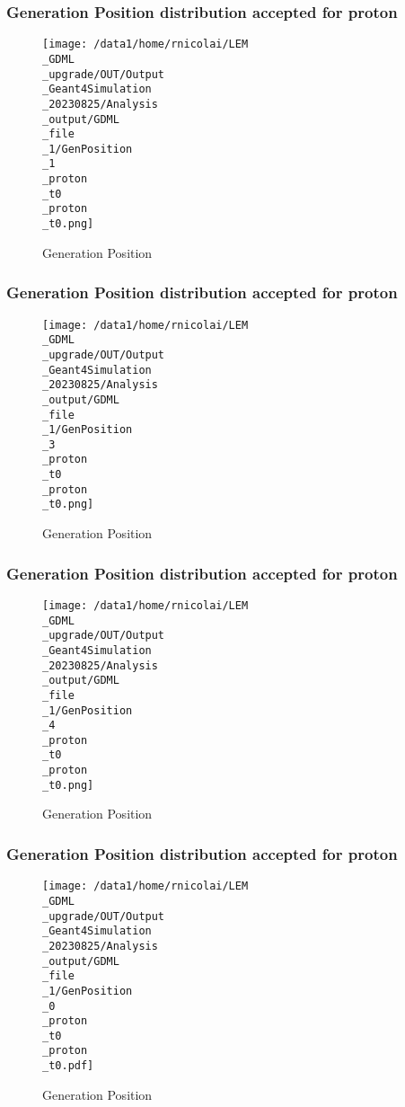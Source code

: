 \documentclass[8pt]{beamer}
\begin{document}
            \begin{frame}
                \frametitle{Generation Position distribution accepted for proton}
            
        \begin{figure}[h]
            \centering
            \texttt{[image: /data1/home/rnicolai/LEM\\\_GDML\\\_upgrade/OUT/Output\\\_Geant4Simulation\\\_20230825/Analysis\\\_output/GDML\\\_file\\\_1/GenPosition\\\_1\\\_proton\\\_t0\\\_proton\\\_t0.png]}
            \caption{Generation Position}
        \end{figure}
        
            \end{frame}
            
            \begin{frame}
                \frametitle{Generation Position distribution accepted for proton}
            
        \begin{figure}[h]
            \centering
            \texttt{[image: /data1/home/rnicolai/LEM\\\_GDML\\\_upgrade/OUT/Output\\\_Geant4Simulation\\\_20230825/Analysis\\\_output/GDML\\\_file\\\_1/GenPosition\\\_3\\\_proton\\\_t0\\\_proton\\\_t0.png]}
            \caption{Generation Position}
        \end{figure}
        
            \end{frame}
            
            \begin{frame}
                \frametitle{Generation Position distribution accepted for proton}
            
        \begin{figure}[h]
            \centering
            \texttt{[image: /data1/home/rnicolai/LEM\\\_GDML\\\_upgrade/OUT/Output\\\_Geant4Simulation\\\_20230825/Analysis\\\_output/GDML\\\_file\\\_1/GenPosition\\\_4\\\_proton\\\_t0\\\_proton\\\_t0.png]}
            \caption{Generation Position}
        \end{figure}
        
            \end{frame}
            
            \begin{frame}
                \frametitle{Generation Position distribution accepted for proton}
            
        \begin{figure}[h]
            \centering
            \texttt{[image: /data1/home/rnicolai/LEM\\\_GDML\\\_upgrade/OUT/Output\\\_Geant4Simulation\\\_20230825/Analysis\\\_output/GDML\\\_file\\\_1/GenPosition\\\_0\\\_proton\\\_t0\\\_proton\\\_t0.pdf]}
            \caption{Generation Position}
        \end{figure}
        
            \end{frame}
            
\end{document}
